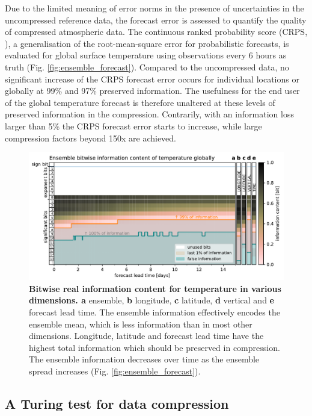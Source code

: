 Due to the limited meaning of error norms in the presence of uncertainties in the uncompressed reference data, the forecast
error is assessed to quantify the quality of compressed atmospheric data. The continuous ranked probability score
(CRPS, \cite{Matheson1976,Hersbach2000,Zamo2018}),
a generalisation of the root-mean-square error for probabilistic forecasts, is evaluated for global surface temperature using observations
every 6 hours as truth (Fig. \ref{fig:ensemble_forecast}). Compared to the uncompressed data, no significant increase of the CRPS forecast error 
occurs for individual locations or globally at 99\% and 97\% preserved information. The usefulness for the end user of the global temperature
forecast is therefore unaltered at these levels of preserved information in the compression. Contrarily, with an information loss larger than
5\% the CRPS forecast error starts to increase, while large compression factors beyond 150x are achieved.

\begin{figure}[tbhp]
	\includegraphics[width=1\textwidth]{Figures/compression/ensemble_information.pdf}
	\caption{\textbf{Bitwise real information content for temperature in various dimensions. a} ensemble, \textbf{b} longitude,
	\textbf{c} latitude, \textbf{d} vertical and \textbf{e} forecast lead time. The ensemble information effectively encodes the
	ensemble mean, which is less information than in most other dimensions. Longitude, latitude and forecast lead time
	have the highest total information which should be preserved in compression. The ensemble information decreases
	over time as the ensemble spread increases (Fig. \ref{fig:ensemble_forecast}).}
	\label{fig:ensemble_information}
\end{figure}

\subsection{A Turing test for data compression}

